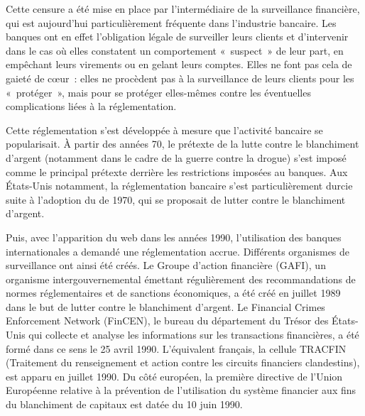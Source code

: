 Cette censure a été mise en place par l'intermédiaire de la surveillance financière, qui est aujourd'hui particulièrement fréquente dans l'industrie bancaire. Les banques ont en effet l'obligation légale de surveiller leurs clients et d'intervenir dans le cas où elles constatent un comportement «~suspect~» de leur part, en empêchant leurs virements ou en gelant leurs comptes. Elles ne font pas cela de gaieté de cœur~: elles ne procèdent pas à la surveillance de leurs clients pour les «~protéger~», mais pour se protéger elles-mêmes contre les éventuelles complications liées à la réglementation.

Cette réglementation s'est développée à mesure que l'activité bancaire se popularisait. À partir des années 70, le prétexte de la lutte contre le blanchiment d'argent (notamment dans le cadre de la guerre contre la drogue) s'est imposé comme le principal prétexte derrière les restrictions imposées au banques. Aux États-Unis notamment, la réglementation bancaire s'est particulièrement durcie suite à l'adoption du  de 1970, qui se proposait de lutter contre le blanchiment d'argent.

Puis, avec l'apparition du web dans les années 1990, l'utilisation des banques internationales a demandé une réglementation accrue. Différents organismes de surveillance ont ainsi été créés. Le Groupe d'action financière (GAFI), un organisme intergouvernemental émettant régulièrement des recommandations de normes réglementaires et de sanctions économiques, a été créé en juillet 1989 dans le but de lutter contre le blanchiment d'argent. Le Financial Crimes Enforcement Network (FinCEN), le bureau du département du Trésor des États-Unis qui collecte et analyse les informations sur les transactions financières, a été formé dans ce sens le 25 avril 1990. L'équivalent français, la cellule TRACFIN (Traitement du renseignement et action contre les circuits financiers clandestins), est apparu en juillet 1990. Du côté européen, la première directive de l'Union Européenne relative à la prévention de l'utilisation du système financier aux fins du blanchiment de capitaux est datée du 10 juin 1990.

